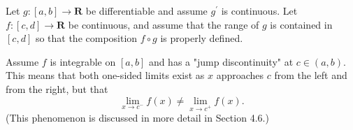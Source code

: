 \begin{exercise} Let $g:[a, b] \rightarrow \mathbf{R}$ be differentiable and assume $g^{\prime}$ is continuous. Let $f:[c, d] \rightarrow \mathbf{R}$ be continuous, and assume that the range of $g$ is contained in $[c, d]$ so that the composition $f \circ g$ is properly defined.
\end{exercise}
\begin{solution}
    \TODO
\end{solution}

\begin{exercise} Assume $f$ is integrable on $[a, b]$ and has a "jump discontinuity" at $c \in(a, b)$. This means that both one-sided limits exist as $x$ approaches $c$ from the left and from the right, but that
$$
\lim _{x \rightarrow c^{-}} f(x) \neq \lim _{x \rightarrow c^{+}} f(x) .
$$
(This phenomenon is discussed in more detail in Section 4.6.)
\end{exercise}
\begin{solution}
    \TODO
\end{solution}

